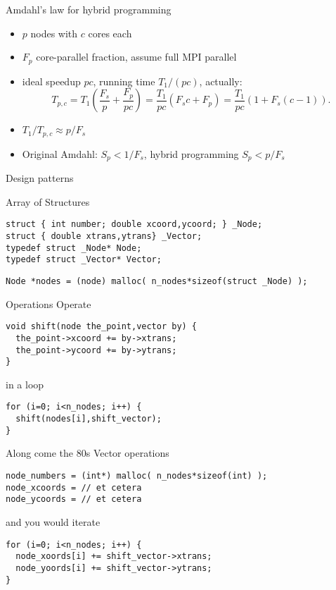 \begin{numberedframe}{Amdahl's law for hybrid programming}
  \begin{itemize}
  \item $p$ nodes with $c$ cores each
  \item $F_p$ core-parallel fraction, assume full MPI parallel
  \item ideal speedup $p c$, running time $T_1/(pc)$, actually:
    \[
    T_{p,c} = T_1 \left(\frac {F_s}{p} + \frac{F_p}{p c}\right)
    = \frac{T_1}{pc}\left( F_sc+F_p\right) 
    = \frac{T_1}{pc}\left( 1+ F_s(c-1)\right).
    \]
    \item $T_1/T_{p,c} \approx p/F_s$
    \item Original Amdahl: $S_p<1/F_s$, hybrid programming $S_p<p/F_s$
  \end{itemize}
\end{numberedframe}

 {Design patterns}

\begin{numberedframe}{Array of Structures}
\begin{lstlisting}
struct { int number; double xcoord,ycoord; } _Node;
struct { double xtrans,ytrans} _Vector;
typedef struct _Node* Node;
typedef struct _Vector* Vector;
\end{lstlisting}
\begin{lstlisting}
Node *nodes = (node) malloc( n_nodes*sizeof(struct _Node) );
\end{lstlisting}
\end{numberedframe}

\begin{numberedframe}{Operations}
Operate
\begin{lstlisting}
void shift(node the_point,vector by) {
  the_point->xcoord += by->xtrans;
  the_point->ycoord += by->ytrans;
}
\end{lstlisting}
in a loop
\begin{lstlisting}
for (i=0; i<n_nodes; i++) {
  shift(nodes[i],shift_vector);
}
\end{lstlisting}
\end{numberedframe}

\begin{numberedframe}{Along come the 80s}
Vector operations
\begin{lstlisting}
node_numbers = (int*) malloc( n_nodes*sizeof(int) );
node_xcoords = // et cetera
node_ycoords = // et cetera
\end{lstlisting}
and you would iterate
\begin{lstlisting}
for (i=0; i<n_nodes; i++) {
  node_xoords[i] += shift_vector->xtrans;
  node_yoords[i] += shift_vector->ytrans;
}
\end{lstlisting}
\end{numberedframe}

